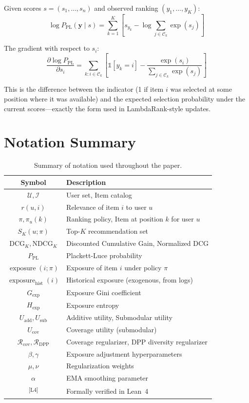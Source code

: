 \documentclass[11pt,a4paper]{article}
\theoremstyle{definition}
\theoremstyle{plain}
\theoremstyle{remark}
\newcommand{\DCG}{\mathrm{DCG}}
\newcommand{\NDCG}{\mathrm{NDCG}}
\DeclareMathOperator{\exposure}{exposure}
\newcommand{\leanmark}{\textsuperscript{\textcolor{green!50!black}{[L4]}}}
\begin{document}
Given scores $s = (s_1, \ldots, s_n)$ and observed ranking $(y_1, \ldots, y_K)$:
\begin{equation}
    \log P_{\text{PL}}(\bm{y} \mid s) = \sum_{k=1}^K \left[ s_{y_k} - \log \sum_{j \in \mathcal{C}_k} \exp(s_j) \right]
\end{equation}

The gradient with respect to $s_i$:
\begin{equation}
    \frac{\partial \log P_{\text{PL}}}{\partial s_i} = \sum_{k: i \in \mathcal{C}_k} \left[ \mathbb{1}[y_k = i] - \frac{\exp(s_i)}{\sum_{j \in \mathcal{C}_k} \exp(s_j)} \right]
\end{equation}

This is the difference between the indicator (1 if item $i$ was selected at some position where it was available) and the expected selection probability under the current scores---exactly the form used in LambdaRank-style updates.

\section{Notation Summary}
\label{app:notation}

\begin{table}[h]
\centering
\begin{tabular}{@{}cl@{}}
\toprule
\textbf{Symbol} & \textbf{Description} \\
\midrule
$\mathcal{U}, \mathcal{I}$ & User set, Item catalog \\
$r(u, i)$ & Relevance of item $i$ to user $u$ \\
$\pi, \pi_u(k)$ & Ranking policy, Item at position $k$ for user $u$ \\
$S_K(u; \pi)$ & Top-$K$ recommendation set \\
$\DCG_K, \NDCG_K$ & Discounted Cumulative Gain, Normalized DCG \\
$P_{\text{PL}}$ & Plackett-Luce probability \\
$\exposure(i; \pi)$ & Exposure of item $i$ under policy $\pi$ \\
$\exposure_{\text{hist}}(i)$ & Historical exposure (exogenous, from logs) \\
$G_{\text{exp}}$ & Exposure Gini coefficient \\
$H_{\text{exp}}$ & Exposure entropy \\
$U_{\text{add}}, U_{\text{sub}}$ & Additive utility, Submodular utility \\
$U_{\text{cov}}$ & Coverage utility (submodular) \\
$\mathcal{R}_{\text{cov}}, \mathcal{R}_{\text{DPP}}$ & Coverage regularizer, DPP diversity regularizer \\
$\beta, \gamma$ & Exposure adjustment hyperparameters \\
$\mu, \nu$ & Regularization weights \\
$\alpha$ & EMA smoothing parameter \\
\leanmark & Formally verified in Lean~4 \\
\bottomrule
\end{tabular}
\caption{Summary of notation used throughout the paper.}
\label{tab:notation}
\end{table}
\end{document}

